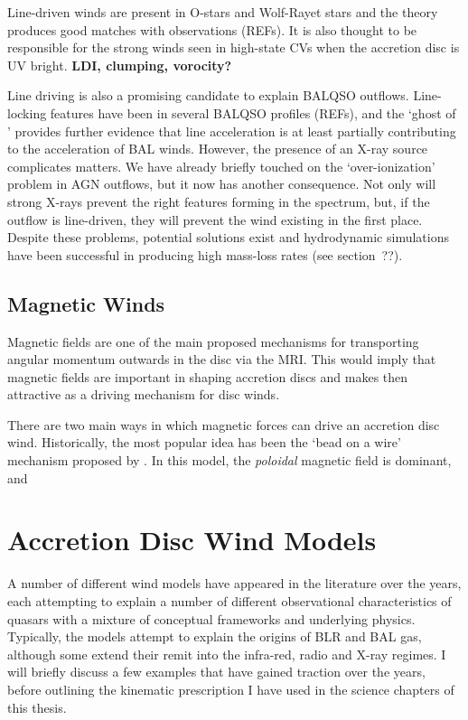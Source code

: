 Line-driven winds are present in O-stars and Wolf-Rayet stars and the theory
produces good matches with observations (REFs). It is also thought to be responsible
for the strong winds seen in high-state CVs when the accretion disc is UV bright.
{\bf LDI, clumping, vorocity?}

Line driving is also a promising candidate to explain BALQSO outflows. 
Line-locking features have been in several BALQSO profiles (REFs), and 
the `ghost of \la' provides further evidence that line acceleration is 
at least partially contributing to the acceleration of BAL winds. 
However, the presence of an X-ray source complicates matters.
We have already briefly touched on the `over-ionization' problem
in AGN outflows, but it now has another consequence. Not only will 
strong X-rays prevent the right features forming in the spectrum, but, if
the outflow is line-driven, they will prevent the wind existing in the first 
place. Despite these problems, potential solutions exist and hydrodynamic
simulations have been successful in producing high mass-loss rates (see section~??).

\subsection{Magnetic Winds}
\label{sec:mag_winds}

Magnetic fields are one of the main proposed mechanisms for transporting
angular momentum outwards in the disc via the MRI. This would imply
that magnetic fields are important in shaping accretion discs and makes
then attractive as a driving mechanism for disc winds.

There are two main ways in which magnetic forces can drive an 
accretion disc wind. Historically, the most popular idea has been the `bead on a wire' mechanism proposed by \citep{blandfordpayne}. In this model,
the {\em poloidal} magnetic field is dominant, and 

\section{Accretion Disc Wind Models}
\label{sec:wind_models}

A number of different wind models have appeared in the literature over the 
years, each attempting to explain a number of different observational characteristics
of quasars with a mixture of conceptual frameworks and underlying physics. 
Typically, the models attempt to explain the origins of BLR and BAL gas, although
some extend their remit into the infra-red, radio and X-ray regimes.
I will briefly discuss a few examples that have gained traction over the years,
before outlining the kinematic prescription I have used in the science chapters
of this thesis. 

